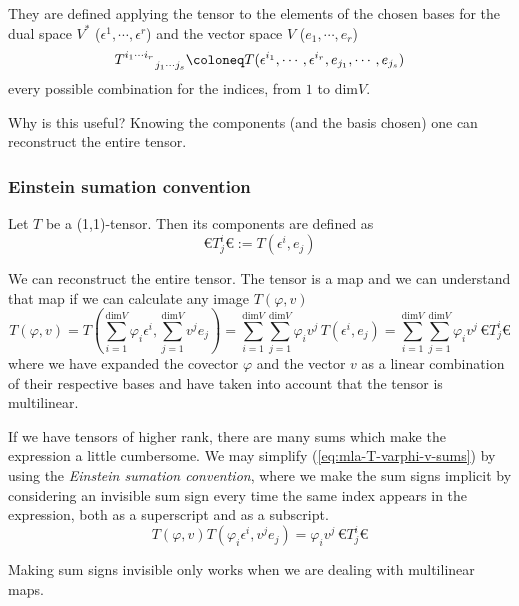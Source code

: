 They are defined applying the tensor to the elements of the chosen bases for the dual space $V^\ast$
($\epsilon^1,\cdots,\epsilon^r$) and the vector space $V$ ($e_1,\cdots,e_r$)
\[
  T^{i_1\cdots i_r}_{\phantom{i_1\cdots i_r}\hspace{.25em}j_1\cdots j_s}
  \coloneq
  T(\epsilon^{i_1},\cdots,\epsilon^{i_r},e_{j_1}, \cdots,e_{j_s})
\]
every possible combination for the indices, from $1$ to $\text{dim} V$.

Why is this useful? Knowing the components (and the basis chosen) one can reconstruct the entire
tensor.

\subsubsection{Einstein sumation convention}
Let $T$ be a (1,1)-tensor.
Then its components are defined as
\[
  €T^i_j€ := T(\epsilon^i,e_j)
\]

We can reconstruct the entire tensor. The tensor is a map and we can understand that map
if we can calculate any image $T(\varphi, v)$
\begin{equation}\label{eq:mla-T-varphi-v-sums}
  T(\varphi,v)
  = T\left(\sum_{i=1}^{\text{dim} V} \varphi_i \epsilon^i, \sum_{j=1}^{\text{dim} V} v^j e_j\right)
  = \sum_{i=1}^{\text{dim} V} \sum_{j=1}^{\text{dim} V} \varphi_i v^j \,T(\epsilon^i,e_j)
  = \sum_{i=1}^{\text{dim} V} \sum_{j=1}^{\text{dim} V} \varphi_i v^j \,€T^i_j€
\end{equation}
where we have expanded the covector $\varphi$ and the vector $v$ as a linear combination of
their respective bases and have taken into account that the tensor is multilinear.

If we have tensors of higher rank, there are many sums which make the expression a little
cumbersome.
We may simplify (\ref{eq:mla-T-varphi-v-sums}) by using the \emph{Einstein sumation convention},
where we make the sum signs implicit by considering an invisible sum sign every time the same index
appears in the expression, both as a superscript and as a subscript.
\[
  T(\varphi,v)
  T(\varphi_i\epsilon^i, v^j e_j)
  = \varphi_i v^j \,€T^i_j€
\]

Making sum signs invisible only works when we are dealing with multilinear maps.


%















  









